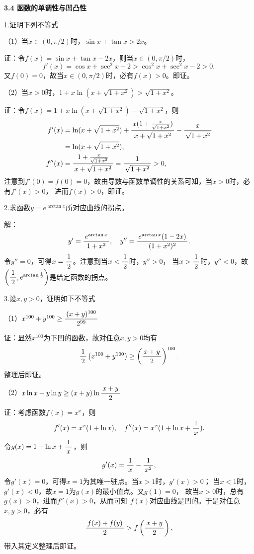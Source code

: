 \begin{center}
	\bf 3.4 函数的单调性与凹凸性
\end{center}

\bigskip

1.证明下列不等式

（1）当$x\in(0,\pi/2)$时，$\sin x+\tan x>2x$。

证：令$f(x)=\sin x+\tan x-2x$，则当$x\in(0,\pi/2)$时，
	$$f'(x)=\cos x+\sec^2x-2>\cos^2x+\sec^2x-2>0,$$
	又$f(0)=0$，故当$x\in(0,\pi/2)$时，必有$f(x)>0$。即证。
\fin

\bigskip

（2）当$x>0$时，$1+x\ln(x+\sqrt{1+x^2})>\sqrt{1+x^2}$。

证：令$f(x)=1+x\ln(x+\sqrt{1+x^2})-\sqrt{1+x^2}$，则
\begin{align*}
	f'(x)&=\ln(x+\sqrt{1+x^2})+\displaystyle\frac{\,{x(1+\frac{x}{\sqrt{1+x^2}})}\,}{\,{x+\sqrt{1+x^2}}\,}-\displaystyle\frac{\,{x}\,}{\,{\sqrt{1+x^2}}\,}\\
	&=\ln(x+\sqrt{1+x^2}),\\
	f''(x)&=\displaystyle\frac{\,{1+\frac{x}{\sqrt{1+x^2}}}\,}{\,{x+\sqrt{1+x^2}}\,}=\displaystyle\frac{\,{1}\,}{\,{\sqrt{1+x^2}}\,}>0,
\end{align*}
注意到$f'(0)=f(0)=0$，故由导数与函数单调性的关系可知，当$x>0$时，必有$f'(x)>0$，
进而$f(x)>0$，即证。
\fin

\bigskip

2.求函数$y=e^{\arctan x}$所对应曲线的拐点。

解：
$$y'=\displaystyle\frac{\,{e^{\arctan x}}\,}{\,{1+x^2}\,},\quad
y''=\displaystyle\frac{\,{e^{\arctan x}(1-2x)}\,}{\,{(1+x^2)^2}\,}.$$
令$y''=0$，可得$x=\displaystyle\frac{\,{1}\,}{\,{2}\,}$。注意到当$x<\displaystyle\frac{\,{1}\,}{\,{2}\,}$时，$y''>0$，
当$x>\displaystyle\frac{\,{1}\,}{\,{2}\,}$时，$y''<0$，故$\left(\displaystyle\frac{\,{1}\,}{\,{2}\,},e^{\arctan\frac12}\right)$是给定函数的拐点。
\fin

\bigskip

3.设$x,y>0$，证明如下不等式

（1）$x^{100}+y^{100}\geq\displaystyle\frac{\,{(x+y)^{100}}\,}{\,{2^{99}}\,}$

证：显然$x^{100}$为下凹的函数，故对任意$x,y>0$均有
$$\displaystyle\frac{\,{1}\,}{\,{2}\,}\left(x^{100}+y^{100}\right)\geq
\left(\displaystyle\frac{\,{x+y}\,}{\,{2}\,}\right)^{100}.$$
整理后即证。\fin

\bigskip

（2）$x\ln x+y\ln y\geq (x+y)\ln\displaystyle\frac{\,{x+y}\,}{\,{2}\,}$

证：考虑函数$f(x)=x^x$，则
$$f'(x)=x^x(1+\ln x),\quad
f''(x)=x^x(1+\ln x+\displaystyle\frac{\,{1}\,}{\,{x}\,}).$$
令$g(x)=1+\ln x+\displaystyle\frac{\,{1}\,}{\,{x}\,}$，则
$$g'(x)=\displaystyle\frac{\,{1}\,}{\,{x}\,}-\displaystyle\frac{\,{1}\,}{\,{x^2}\,},$$
令$g'(x)=0$，可得$x=1$为其唯一驻点。当$x>1$时，$g'(x)>0$；
当$x<1$时，$g'(x)<0$，故$x=1$为$g(x)$的最小值点。又$g(1)=0$，
故当$x>0$时，总有$g(x)>0$，进而$f''(x)>0$，从而可知
$f(x)$对应曲线是凹的。于是对任意$x,y>0$，必有
$$\displaystyle\frac{\,{f(x)+f(y)}\,}{\,{2}\,}>f\left(\displaystyle\frac{\,{x+y}\,}{\,{2}\,}\right),$$
带入其定义整理后即证。\fin

